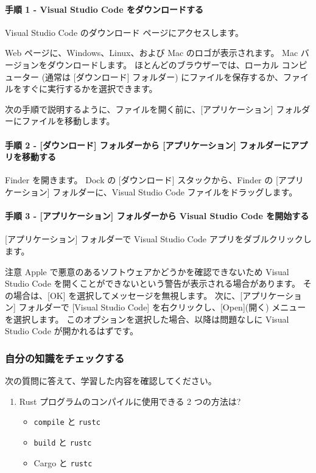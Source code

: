 \paragraph{手順 1 - Visual Studio Code をダウンロードする}

Visual Studio Code のダウンロード ページにアクセスします。

Web ページに、Windows、Linux、および Mac のロゴが表示されます。 Mac バージョンをダウンロードします。 ほとんどのブラウザーでは、ローカル コンピューター (通常は [ダウンロード] フォルダー) にファイルを保存するか、ファイルをすぐに実行するかを選択できます。

次の手順で説明するように、ファイルを開く前に、[アプリケーション] フォルダーにファイルを移動します。

\paragraph{手順 2 - [ダウンロード] フォルダーから [アプリケーション] フォルダーにアプリを移動する}

Finder を開きます。 Dock の [ダウンロード] スタックから、Finder の [アプリケーション] フォルダーに、Visual Studio Code ファイルをドラッグします。

\paragraph{手順 3 - [アプリケーション] フォルダーから Visual Studio Code を開始する}

[アプリケーション] フォルダーで Visual Studio Code アプリをダブルクリックします。

\begin{itembox}[l]{注意}
Apple で悪意のあるソフトウェアかどうかを確認できないため Visual Studio Code を開くことができないという警告が表示される場合があります。 その場合は、[OK] を選択してメッセージを無視します。 次に、[アプリケーション] フォルダーで [Visual Studio Code] を右クリックし、[Open](開く) メニューを選択します。 このオプションを選択した場合、以降は問題なしに Visual Studio Code が開かれるはずです。
\end{itembox}

\subsubsection{自分の知識をチェックする}

次の質問に答えて、学習した内容を確認してください。

\begin{enumerate}
\item Rust プログラムのコンパイルに使用できる 2 つの方法は?
\begin{itemize}
\item \texttt{compile} と \texttt{rustc}
\item \texttt{build} と \texttt{rustc}
\item Cargo と \texttt{rustc}
\end{itemize}
\end{enumerate}